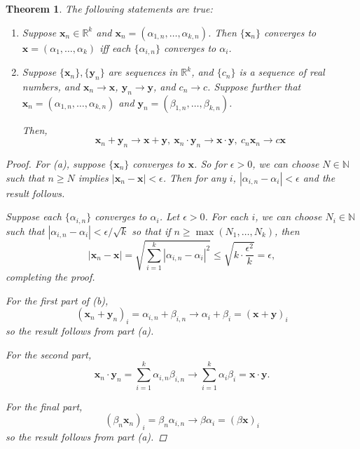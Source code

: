 \documentclass{scrbook}
\newcommand{\N}{\mathbb{N}}
\newcommand{\R}{\mathbb{R}}
\renewcommand{\to}{\rightarrow}
\newtheorem{theorem}{Theorem}
\begin{document}
\begin{theorem} %
The following statements are true:
\begin{enumerate}
\item Suppose $\textbf{x}_n \in \R^k$ and $\textbf{x}_n = (\alpha_{1,n}, \dotsc, \alpha_{k,n})$. Then $\{\textbf{x}_n\}$ converges to $\textbf{x} = (\alpha_1, \dotsc, \alpha_k)$ iff each $\{\alpha_{i,n}\}$ converges to $\alpha_i$.

\item Suppose $\{\textbf{x}_n\}, \{\textbf{y}_n\}$ are sequences in $\R^k$, and $\{c_n\}$ is a sequence of real numbers, and $\textbf{x}_n \to \textbf{x}$, $\textbf{y}_n \to \textbf{y}$, and $c_n \to c$. Suppose further that $\textbf{x}_n = (\alpha_{1,n}, \dotsc, \alpha_{k,n})$ and $\textbf{y}_n = (\beta_{1,n}, \dotsc, \beta_{k,n})$. 

Then,
\[
	\textbf{x}_n + \textbf{y}_n \to \textbf{x} + \textbf{y},\ \textbf{x}_n \cdot \textbf{y}_n \to \textbf{x} \cdot \textbf{y},\ c_n\textbf{x}_n \to c \textbf{x}
\] 
\end{enumerate}
\begin{proof}
For (a), suppose $\{\textbf{x}_n\}$ converges to $\textbf{x}$. So for $\epsilon > 0$, we can choose $N \in \N$ such that $n \ge N$ implies $|\textbf{x}_n - \textbf{x}| < \epsilon$. Then for any $i$, $|\alpha_{i,n} - \alpha_i| < \epsilon$ and the result follows.

Suppose each $\{\alpha_{i,n}\}$ converges to $\alpha_i$. Let $\epsilon > 0$. For each $i$, we can choose $N_i \in \N$ such that $|\alpha_{i,n} - \alpha_i| < \epsilon/\sqrt{k}$ so that if $n \ge \max(N_1, \dotsc, N_k)$, then
\[
	|\textbf{x}_n - \textbf{x}| = \sqrt{\sum_{i=1}^{k} |\alpha_{i,n} - \alpha_i|^2} \le \sqrt{k \cdot \frac{\epsilon^2}{k}} = \epsilon,
\]
completing the proof.

For the first part of (b), 
\[
	(\textbf{x}_n + \textbf{y}_n)_{i} = \alpha_{i,n} + \beta_{i,n} \to \alpha_i + \beta_i = (\textbf{x} + \textbf{y})_i
\]
so the result follows from part (a).

For the second part, 
\[
	\textbf{x}_n \cdot \textbf{y}_n = \sum_{i=1}^{k} \alpha_{i,n} \beta_{i,n} \to \sum_{i=1}^{k} \alpha_i \beta_i = \textbf{x} \cdot \textbf{y}.
\]

For the final part,
\[
	(\beta_n \textbf{x}_n)_i = \beta_n \alpha_{i,n} \to \beta \alpha_i = (\beta \textbf{x})_i
\]
so the result follows from part (a).
\end{proof}
\end{theorem}
\end{document}
